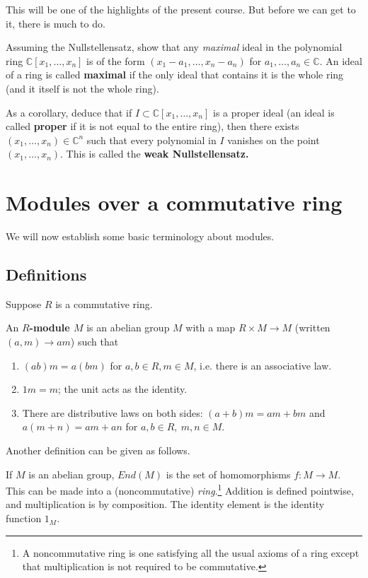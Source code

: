 This will be one of the highlights of the present course. But before we can
get to it, there is much to do.

\begin{exercise} 
Assuming the Nullstellensatz, show that any \emph{maximal} ideal in the
polynomial ring $\mathbb{C}[x_1, \dots, x_n]$ is of the form 
$(x_1-a_1, \dots, x_n-a_n)$ for $a_1, \dots, a_n \in \mathbb{C}$. An ideal of a
ring is called \textbf{maximal} if the only ideal that contains it is the
whole ring (and it itself is not the whole ring).

As a corollary, deduce that if $I \subset \mathbb{C}[x_1, \dots, x_n]$ is a
proper ideal (an ideal is called \textbf{proper} if it is not equal to the
entire ring), then there exists $(x_1, \dots, x_n) \in \mathbb{C}^n$ such that
every polynomial in $I$ vanishes on the point $(x_1, \dots, x_n)$. This is
called the \textbf{weak Nullstellensatz.}
\end{exercise} 

\section{Modules over a commutative ring}



We will now establish some basic terminology about modules.

\subsection{Definitions}
Suppose $R$ is a commutative ring.  

\begin{definition} 
An \textbf{$R$-module $M$} is an abelian group $M$ with a map $R \times M \to
M$ (written $(a,m) \to am$) such that
\begin{enumerate}[\textbf{M} 1]
\item  $(ab) m = a(bm)$ for $a,b \in R, m \in M$, i.e. there is an associative law. 
\item $1m
= m$; the unit acts as the identity. 
\item There are distributive laws
on both sides:
$(a+b)m = am + bm$ and $a(m+n) = am + an$ for $a,b \in R, \ m,n \in M$.

\end{enumerate} \end{definition} 

Another definition can be given  as follows.
\begin{definition} 
If $M$ is an abelian group, $End(M)$ is the set of homomorphisms $f: M \to M$.  
This can be made into a (noncommutative) \emph{ring}.\footnote{A
noncommutative ring is one satisfying all the usual axioms of a ring except
that multiplication is not required to be commutative.} Addition is defined pointwise, and
multiplication is by composition. The identity element is the identity
function $1_M$.
\end{definition} 

